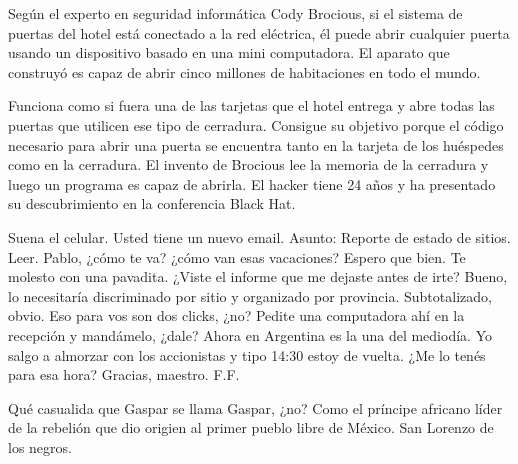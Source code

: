 \documentclass[12pt,twoside,openright,a5paper]{book}
\begin{document}
Según el experto en seguridad informática Cody Brocious, si el sistema
de puertas del hotel está conectado a la red eléctrica, él puede abrir
cualquier puerta usando un dispositivo basado en una mini computadora. 
El aparato que construyó es capaz de abrir cinco millones de
habitaciones en todo el mundo.

Funciona como si fuera una de las tarjetas que el hotel entrega
y abre todas las puertas que utilicen ese tipo de cerradura. Consigue su
objetivo porque el código necesario para abrir una puerta se encuentra
tanto en la tarjeta de los huéspedes como en la cerradura. El invento de
Brocious lee la memoria de la cerradura y luego un programa es capaz de
abrirla. El hacker tiene 24 años y ha presentado su descubrimiento en la
conferencia Black Hat.


\vspace{0.5cm}
\hrulefill\hspace{0.2cm} \decofourleft\decofourright \hspace{0.2cm} \hrulefill
\vspace{0.5cm}

Suena el celular. Usted tiene un nuevo email. Asunto: Reporte de estado de sitios. Leer. Pablo, ¿cómo te va? ¿cómo van esas vacaciones? Espero que bien.
Te molesto con una pavadita. ¿Viste el informe que me dejaste antes de irte?
Bueno, lo necesitaría discriminado por sitio y organizado por provincia.
Subtotalizado, obvio. Eso para vos son dos clicks, ¿no?
Pedite una computadora ahí en la recepción y mandámelo, ¿dale? Ahora en
Argentina es la una del mediodía. Yo salgo a almorzar con los accionistas
y tipo 14:30 estoy de vuelta. ¿Me lo tenés para esa hora?
Gracias, maestro.
F.F.


\vspace{0.5cm}
\hrulefill\hspace{0.2cm} \decofourleft\decofourright \hspace{0.2cm} \hrulefill
\vspace{0.5cm}

Qué casualida que Gaspar se llama Gaspar, ¿no? Como el príncipe africano
líder de la rebelión que dio origien al primer pueblo libre de México. San
Lorenzo de los negros.


\vspace{0.5cm}
\hrulefill\hspace{0.2cm} \decofourleft\decofourright \hspace{0.2cm} \hrulefill
\vspace{0.5cm}
\end{document}
